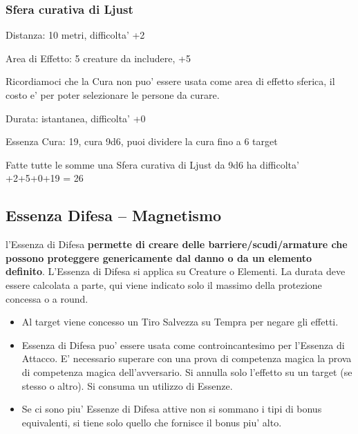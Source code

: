\documentclass[a4paper,11pt,twoside,openany]{dndbook}
\begin{document}
\subsubsection{Sfera curativa di Ljust}

Distanza: 10 metri, difficolta' +2

Area di Effetto: 5 creature da includere, +5

Ricordiamoci che la Cura non puo' essere usata come area di effetto sferica, il costo e' per poter selezionare le persone da curare.

Durata: istantanea, difficolta' +0

Essenza Cura: 19, cura 9d6, puoi dividere la cura fino a 6 target

Fatte tutte le somme una Sfera curativa di Ljust da 9d6 ha difficolta' +2+5+0+19 = 26

\pagebreak

\subsection{Essenza Difesa -- Magnetismo}

\label{essenza-difesa---magnetismo}

l'Essenza di Difesa \textbf{permette di creare delle barriere/scudi/armature che possono proteggere genericamente dal danno o da un elemento definito}. L'Essenza di Difesa si applica su Creature o Elementi. La durata deve essere calcolata a parte, qui viene indicato solo il massimo della protezione concessa o a round.
\begin{itemize}
\item 
Al target viene concesso un Tiro Salvezza su Tempra per negare gli effetti. 
\item 
Essenza di Difesa puo' essere usata come controincantesimo per l'Essenza di Attacco. E' necessario superare con una prova di competenza magica la prova di competenza magica dell'avversario. Si annulla solo l'effetto su un target (se stesso o altro). Si consuma un utilizzo di Essenze. 
\item 
Se ci sono piu' Essenze di Difesa attive non si sommano i tipi di bonus equivalenti, si tiene solo quello che fornisce il bonus piu' alto. 
\end{itemize}

\bigskip
\end{document}
